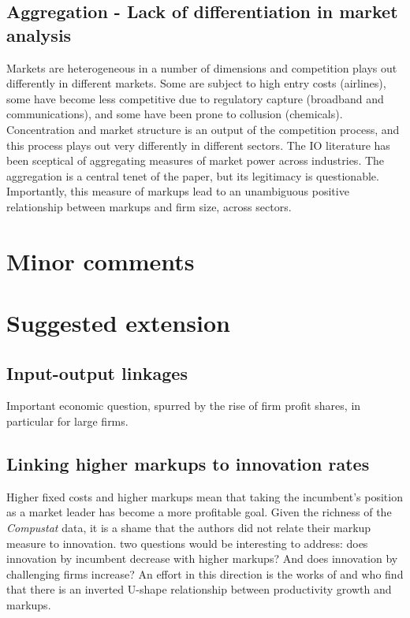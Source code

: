 \documentclass{amsart}
\theoremstyle{definition}
\theoremstyle{remark}
\numberwithin{equation}{section}
\begin{document}
\subsection*{Aggregation - Lack of differentiation in market analysis} Markets are heterogeneous in a number of dimensions and competition plays out differently in different markets. Some are subject to high entry costs (airlines), some have become less  competitive due to regulatory capture (broadband and communications), and some have been prone to collusion (chemicals). Concentration and market structure is an output of the competition process, and this process plays out very differently in different sectors. The IO literature has been sceptical of aggregating measures of market power across industries. The aggregation is a central tenet of the paper, but its legitimacy is questionable.\\

Importantly, this measure of markups lead to an unambiguous positive relationship between markups and firm size, across sectors.\\


\subsubsection{}

\section{Minor comments}

\section{Suggested extension}

\subsection*{Input-output linkages}

Important economic question, spurred by the rise of firm profit shares, in particular for large firms.\\

\subsection*{Linking higher markups to innovation rates} Higher fixed costs and higher markups mean that taking the incumbent's position as a market leader has become a more profitable goal. Given the richness of the \textit{Compustat} data, it is a shame that the authors did not relate their markup measure to innovation. two questions would be interesting to address: does innovation by incumbent decrease with higher markups? And does innovation by challenging firms increase? An effort in this direction is the works of \cite{aghion2008competition} and \cite{aghion2019theory} who find that there is an inverted U-shape relationship between productivity growth and markups.
\end{document}
